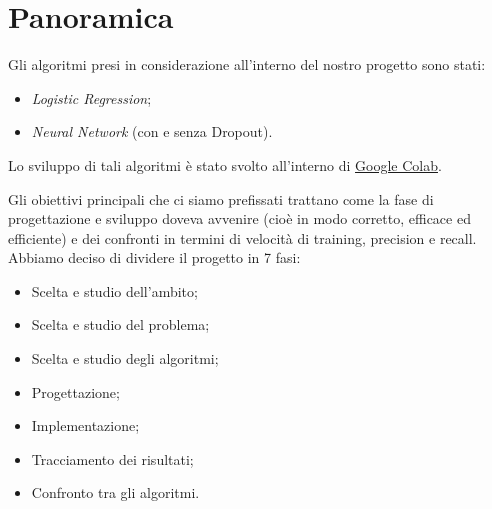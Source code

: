 \newpage
\section{Panoramica}
Gli algoritmi presi in considerazione all'interno del nostro progetto sono stati:
\begin{itemize}
	\item \textit{Logistic Regression};
	\item \textit{Neural Network} (con e senza Dropout). 
\end{itemize}
Lo sviluppo di tali algoritmi è stato svolto all'interno di \href{https://colab.research.google.com/notebooks/welcome.ipynb}{Google Colab}. 

Gli obiettivi principali che ci siamo prefissati trattano come la fase di progettazione e sviluppo doveva avvenire (cioè in modo corretto, efficace ed efficiente) e dei confronti in termini di velocità di training, precision e recall.\\
Abbiamo deciso di dividere il progetto in 7 fasi:
\begin{itemize}
	\item{Scelta e studio dell'ambito;}
	\item{Scelta e studio del problema;}
	\item{Scelta e studio degli algoritmi;}
	\item{Progettazione;}
	\item{Implementazione;}
	\item{Tracciamento dei risultati;}
	\item{Confronto tra gli algoritmi.}
\end{itemize}

\newpage
